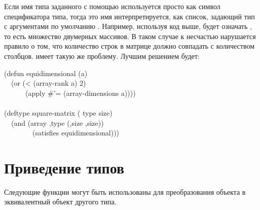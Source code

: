 \begin{defmac}
Если имя типа заданного с помощью  используется просто как символ
спецификатора типа, тогда это имя интерпретируется, как список, задающий тип с
аргументами по умолчанию \cdf{*}. Например, используя код выше,
 будет означать , то есть множество двумерных
массивов.
В таком случае к несчастью нарушается правило о том, что количество строк в
матрице должно совпадать с количеством столбцов.  имеет
такую же проблему.
Лучшим решением будет:
\begin{lisp}
(defun equidimensional (a) \\
~~(or (< (array-rank a) 2) \\
~~~~~~(apply \#'= (array-dimensions a)))) \\
 \\
(deftype square-matrix ( type size) \\
~~{\Xbq}(and (array ,type (,size ,size)) \\
~~~~~~~~(satisfies equidimensional)))
\end{lisp}
\end{defmac}

\section{Приведение типов}

Следующие функции могут быть использованы для преобразования объекта в
эквивалентный объект другого типа.

